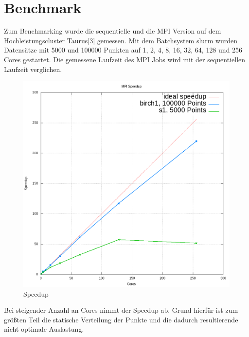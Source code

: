 \section{Benchmark}
	Zum Benchmarking wurde die sequentielle und die MPI Version auf dem Hochleistungscluster Taurus[3] gemessen. Mit dem Batchsystem slurm wurden Datensätze mit
	5000 und 100000 Punkten auf 1, 2, 4, 8, 16, 32, 64, 128 und 256 Cores gestartet. Die gemessene Laufzeit des MPI Jobs wird mit der sequentiellen
	Laufzeit verglichen.\\
	\begin{figure}[H] \centering
		\includegraphics[scale=0.61]{../meanshift/output/pics/speedup.png} 
		\caption{Speedup}
	\end{figure}
	Bei steigender Anzahl an Cores nimmt der Speedup ab. Grund hierfür ist zum größten Teil die statische Verteilung der Punkte und die dadurch
	resultierende nicht optimale Auslastung.\\
	\newpage
